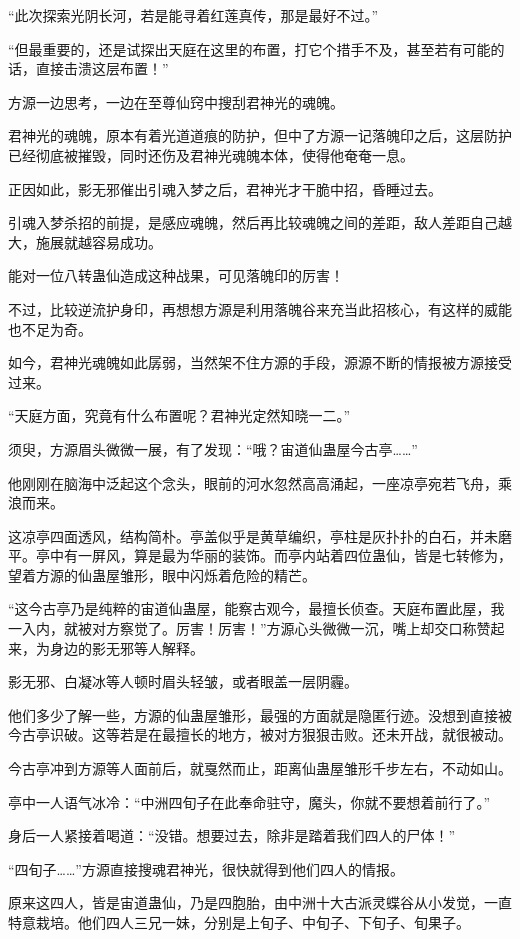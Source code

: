 \begin{this_body}
“此次探索光阴长河，若是能寻着红莲真传，那是最好不过。”

“但最重要的，还是试探出天庭在这里的布置，打它个措手不及，甚至若有可能的话，直接击溃这层布置！”

方源一边思考，一边在至尊仙窍中搜刮君神光的魂魄。

君神光的魂魄，原本有着光道道痕的防护，但中了方源一记落魄印之后，这层防护已经彻底被摧毁，同时还伤及君神光魂魄本体，使得他奄奄一息。

正因如此，影无邪催出引魂入梦之后，君神光才干脆中招，昏睡过去。

引魂入梦杀招的前提，是感应魂魄，然后再比较魂魄之间的差距，敌人差距自己越大，施展就越容易成功。

能对一位八转蛊仙造成这种战果，可见落魄印的厉害！

不过，比较逆流护身印，再想想方源是利用落魄谷来充当此招核心，有这样的威能也不足为奇。

如今，君神光魂魄如此孱弱，当然架不住方源的手段，源源不断的情报被方源接受过来。

“天庭方面，究竟有什么布置呢？君神光定然知晓一二。”

须臾，方源眉头微微一展，有了发现：“哦？宙道仙蛊屋今古亭……”

他刚刚在脑海中泛起这个念头，眼前的河水忽然高高涌起，一座凉亭宛若飞舟，乘浪而来。

这凉亭四面透风，结构简朴。亭盖似乎是黄草编织，亭柱是灰扑扑的白石，并未磨平。亭中有一屏风，算是最为华丽的装饰。而亭内站着四位蛊仙，皆是七转修为，望着方源的仙蛊屋雏形，眼中闪烁着危险的精芒。

“这今古亭乃是纯粹的宙道仙蛊屋，能察古观今，最擅长侦查。天庭布置此屋，我一入内，就被对方察觉了。厉害！厉害！”方源心头微微一沉，嘴上却交口称赞起来，为身边的影无邪等人解释。

影无邪、白凝冰等人顿时眉头轻皱，或者眼盖一层阴霾。

他们多少了解一些，方源的仙蛊屋雏形，最强的方面就是隐匿行迹。没想到直接被今古亭识破。这等若是在最擅长的地方，被对方狠狠击败。还未开战，就很被动。

今古亭冲到方源等人面前后，就戛然而止，距离仙蛊屋雏形千步左右，不动如山。

亭中一人语气冰冷：“中洲四旬子在此奉命驻守，魔头，你就不要想着前行了。”

身后一人紧接着喝道：“没错。想要过去，除非是踏着我们四人的尸体！”

“四旬子……”方源直接搜魂君神光，很快就得到他们四人的情报。

原来这四人，皆是宙道蛊仙，乃是四胞胎，由中洲十大古派灵蝶谷从小发觉，一直特意栽培。他们四人三兄一妹，分别是上旬子、中旬子、下旬子、旬果子。

\end{this_body}

